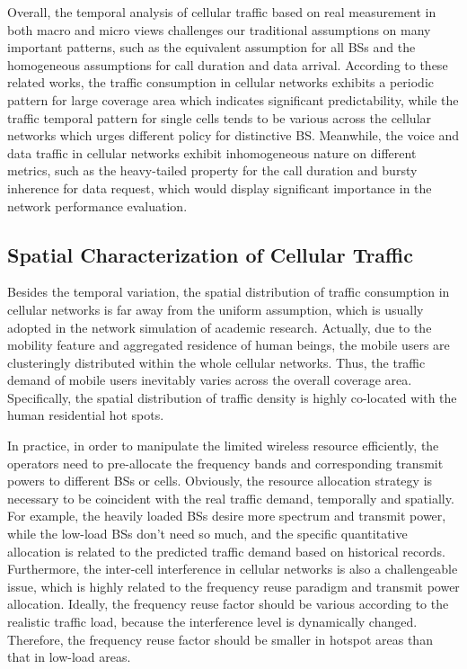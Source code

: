 Overall, the temporal analysis of cellular traffic based on real measurement in both macro and micro views challenges our traditional assumptions on many important patterns, such as the equivalent assumption for all BSs and the homogeneous assumptions for call duration and data arrival. According to these related works, the traffic consumption in cellular networks exhibits a periodic pattern for large coverage area which indicates significant predictability, while the traffic temporal pattern for single cells tends to be various across the cellular networks which urges different policy for distinctive BS. Meanwhile, the voice and data traffic in cellular networks exhibit inhomogeneous nature on different metrics, such as the heavy-tailed property for the call duration and bursty inherence for data request, which would display significant importance in the network performance evaluation.

\subsection{Spatial Characterization of Cellular Traffic}
Besides the temporal variation, the spatial distribution of traffic consumption in cellular networks is far away from the uniform assumption, which is usually adopted in the network simulation of academic research. Actually, due to the mobility feature and aggregated residence of human beings, the mobile users are clusteringly distributed within the whole cellular networks. Thus, the traffic demand of mobile users inevitably varies across the overall coverage area. Specifically, the spatial distribution of traffic density is highly co-located with the human residential hot spots.

In practice, in order to manipulate the limited wireless resource efficiently, the operators need to pre-allocate the frequency bands and corresponding transmit powers to different BSs or cells. Obviously, the resource allocation strategy is necessary to be coincident with the real traffic demand, temporally and spatially. For example, the heavily loaded BSs desire more spectrum and transmit power, while the low-load BSs don't need so much, and the specific quantitative allocation is related to the predicted traffic demand based on historical records. Furthermore, the inter-cell interference in cellular networks is also a challengeable issue, which is highly related to the frequency reuse paradigm and transmit power allocation. Ideally, the frequency reuse factor should be various according to the realistic traffic load, because the interference level is dynamically changed. Therefore, the frequency reuse factor should be smaller in hotspot areas than that in low-load areas.

